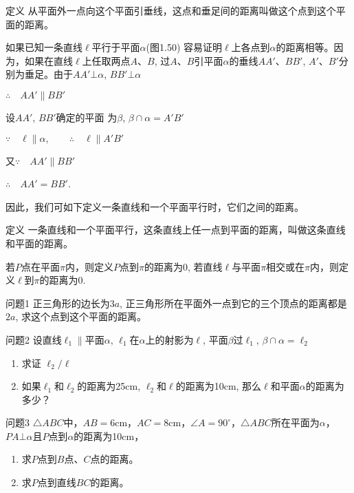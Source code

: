   \begin{blk}
    {定义} 从平面外一点向这个平面引垂线，这点和垂足间的距离叫做这个点到这个平面的距离。
  \end{blk}
  
  如果已知一条直线$\ell$平行于平面$\alpha$(图1.50) 容易证明$\ell$上各点到$\alpha$的距离相等。因为，如果在直线$\ell$上任取两点$A$、$B$, 过$A$、$B$引平面$\alpha$的垂线$AA'$、$BB'$, $A'$、$B'$分别为垂足。由于$AA'\bot\alpha$, $BB'\bot \alpha$
  
  $\therefore\quad AA'\parallel BB'$
  
  设$AA'$, $BB'$确定的平面
  为$\beta$, $\beta\cap\alpha=A'B'$
  
  $\because\quad \ell\parallel \alpha,\qquad \therefore\quad \ell\parallel A'B'$
  
  又$\because\quad AA'\parallel BB'$
  
  $\therefore\quad AA'=BB'$.
  
  因此，我们可如下定义一条直线和一个平面平行时，它们之间的距离。
  
  \begin{blk}
    {定义} 一条直线和一个平面平行，这条直线上任一点到平面的距离，叫做这条直线和平面的距离。
  \end{blk}
  
  若$P$点在平面$\pi$内，则定义$P$点到$\pi$的距离为0, 若直线$\ell$与平面$\pi$相交或在$\pi$内，则定义$\ell$到$\pi$的距离为0.
  
  \begin{blk}
    {问题1} 正三角形的边长为$3a$, 正三角形所在平面外一点到它的三个顶点的距离都是$2a$, 求这个点到这个平面的距离。
  \end{blk}
  
  \begin{blk}
    {问题2} 设直线$\ell_1\parallel$平面$\alpha$, $\ell_1$在$\alpha$上的射影为$\ell$, 平面$\beta$过$\ell_1$, $\beta\cap\alpha=\ell_2$ 
  \begin{enumerate}
    \item 求证 $\ell_2/\ell$
    \item 如果$\ell_1$和$\ell_2$的距离为25cm, $\ell_2$和$\ell$的距离为10cm, 那么$\ell$和平面$\alpha$的距离为多少？
  \end{enumerate}
  \end{blk}
  
  \begin{blk}{问题3} 
    $\triangle ABC$中，$AB=6$cm，$AC=8$cm，$\angle A=90^{\circ}$，$\triangle ABC$所在平面为$\alpha$，$PA\bot \alpha$且$P$点到$\alpha$的距离为10cm，
  \begin{enumerate}
    \item 求$P$点到$B$点、$C$点的距离。
    \item 求$P$点到直线$BC$的距离。
  \end{enumerate}
  \end{blk}
  
